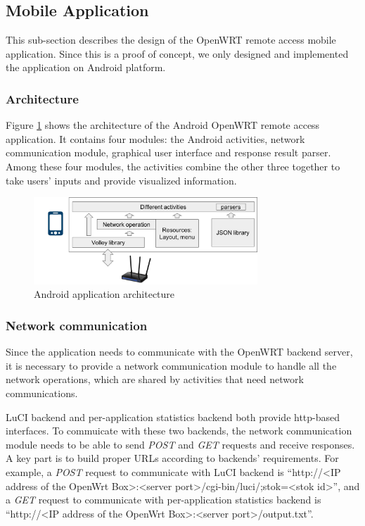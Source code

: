 \subsection{Mobile Application}
This sub-section describes the design of the OpenWRT remote access mobile application. Since this is a proof of concept, we only designed and implemented the application on Android platform.

\subsubsection{Architecture}
Figure \ref{android-architecture} shows the architecture of the Android OpenWRT remote access application. It contains four modules: the Android activities, network communication module, graphical user interface and response result parser. Among these four modules, the activities combine the other three together to take users' inputs and provide visualized information.

\begin{figure}
	\centering
	\includegraphics[width=0.75\textwidth]{android-architecture.png}
	\caption{Android application architecture}
	\label{android-architecture}
\end{figure}

\subsubsection{Network communication}
Since the application needs to communicate with the OpenWRT backend server, it is necessary to provide a network communication module to handle all the network operations, which are shared by activities that need network communications.

LuCI backend and per-application statistics backend both provide http-based interfaces. To commuicate with these two backends, the network communication module needs to be able to send \textit{POST} and \textit{GET} requests and receive responses. A key part is to build proper URLs according to backends' requirements. For example, a \textit{POST} request to communicate with LuCI backend is ``http://<IP address of the OpenWrt Box>:<server port>/cgi-bin/luci/;stok=<stok id>'', and a \textit{GET} request to communicate with per-application statistics backend is ``http://<IP address of the OpenWrt Box>:<server port>/output.txt''.

